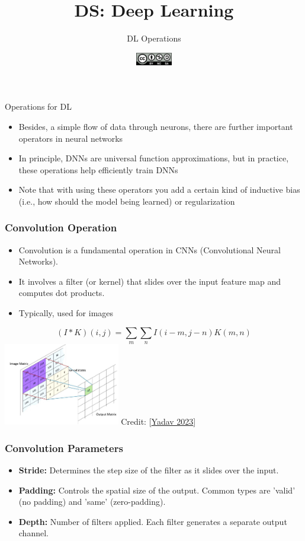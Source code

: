 \documentclass[aspectratio=169]{../latex_main/tntbeamer}  %
\title[DL: DL Operations]{DS: Deep Learning}
\subtitle{DL Operations}
\date{\hspace{0.5em} {\includegraphics[height=1.5em]{../latex_main/figures/Cc-by-nc-sa_icon.svg.png}}}
\begin{document}
	
	\maketitle

    \begin{frame}{Operations for DL}
        \begin{itemize}
            \item Besides, a simple flow of data through neurons, there are further important operators in neural networks
            \item In principle, DNNs are universal function approximations, but in practice, these operations help efficiently train DNNs
            \item Note that with using these operators you add a certain kind of inductive bias (i.e., how should the model being learned) or regularization 
        \end{itemize}
    \end{frame}
 
    \begin{frame}
    \frametitle{Convolution Operation}
    \begin{itemize}
        \item Convolution is a fundamental operation in CNNs (Convolutional Neural Networks).
        \item It involves a filter (or kernel) that slides over the input feature map and computes dot products.
        \item Typically, used for images
    \end{itemize}
    \begin{equation}
        (I * K)(i,j) = \sum_{m}\sum_{n} I(i-m,j-n)K(m,n)
    \end{equation}
        \centering
            \includegraphics[width=0.38\textwidth]{figures/convolution.jpg}
        Credit: [\href{https://www.linkedin.com/pulse/image-processing-convolution-filters-calculation-gradients-yadav/}{Yadav 2023}]
    \end{frame}
    
    \begin{frame}
    \frametitle{Convolution Parameters}
    \begin{itemize}
        \item \textbf{Stride:} Determines the step size of the filter as it slides over the input.
        \item \textbf{Padding:} Controls the spatial size of the output. Common types are 'valid' (no padding) and 'same' (zero-padding).
        \item \textbf{Depth:} Number of filters applied. Each filter generates a separate output channel.
    \end{itemize}
    \end{frame}
\end{document}
